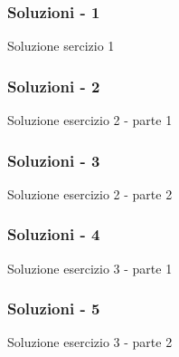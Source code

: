 \begin{frame}[fragile]

  \frametitle{Soluzioni - 1}
 
\begin{block}{Soluzione sercizio 1}

\end{block}
\end{frame}

\begin{frame}[fragile]

  \frametitle{Soluzioni - 2}
  
\begin{block}{Soluzione esercizio 2 - parte 1}

\end{block}
\end{frame}

\begin{frame}[fragile]

  \frametitle{Soluzioni - 3}
  
\begin{block}{Soluzione esercizio 2 - parte 2}

\end{block}
\end{frame}

\begin{frame}[fragile]

  \frametitle{Soluzioni - 4}
  
\begin{block}{Soluzione esercizio 3 - parte 1}

\end{block}
\end{frame}

\begin{frame}[fragile]

  \frametitle{Soluzioni - 5}
  
\begin{block}{Soluzione esercizio 3 - parte 2}

\end{block}
\end{frame}